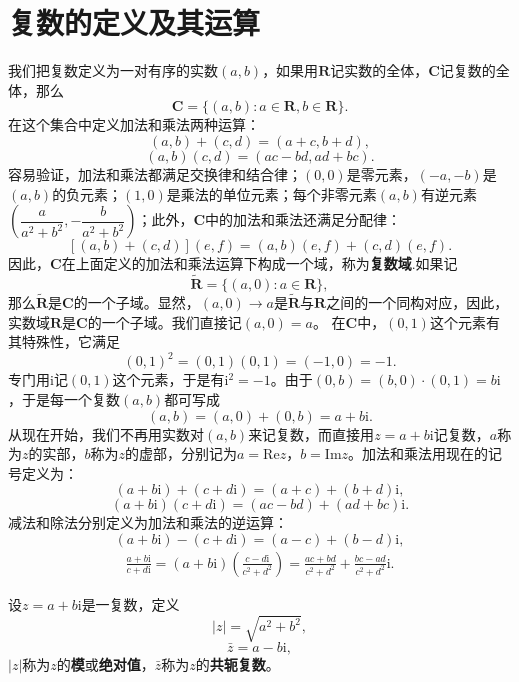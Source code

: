 \documentclass[../../main.tex]{subfiles}
\begin{document}
\section{复数的定义及其运算}

\begin{definition}[复数域]
我们把复数定义为一对有序的实数\((a,b)\)，如果用\(\mathbf{R}\)记实数的全体，\(\mathbf{C}\)记复数的全体，那么
\[
\mathbf{C} = \{ (a,b) : a \in \mathbf{R}, b \in \mathbf{R} \}.
\]
在这个集合中定义加法和乘法两种运算：
\[
(a,b) + (c,d) = (a + c, b + d),
\]
\[
(a,b)(c,d) = (ac - bd, ad + bc).
\]
容易验证，加法和乘法都满足交换律和结合律；\((0,0)\)是零元素，\((-a,-b)\)是\((a,b)\)的负元素；\((1,0)\)是乘法的单位元素；每个非零元素\((a,b)\)有逆元素\(\left( \dfrac{a}{a^2 + b^2}, -\dfrac{b}{a^2 + b^2} \right)\)；此外，\(\mathbf{C}\)中的加法和乘法还满足分配律：
\[
[(a,b) + (c,d)](e,f) = (a,b)(e,f) + (c,d)(e,f).
\]
因此，\(\mathbf{C}\)在上面定义的加法和乘法运算下构成一个域，称为\textbf{复数域}.如果记
\[
\tilde{\mathbf{R}} = \{ (a,0) : a \in \mathbf{R} \},
\]
那么\(\tilde{\mathbf{R}}\)是\(\mathbf{C}\)的一个子域。显然，\((a,0) \to a\)是\(\tilde{\mathbf{R}}\)与\(\mathbf{R}\)之间的一个同构对应，因此，实数域\(\mathbf{R}\)是\(\mathbf{C}\)的一个子域。我们直接记\((a,0) = a\)。
在\(\mathbf{C}\)中，\((0,1)\)这个元素有其特殊性，它满足
\[
(0,1)^2 = (0,1)(0,1) = (-1,0) = -1.
\]
专门用\(\mathrm{i}\)记\((0,1)\)这个元素，于是有\(\mathrm{i}^2 = -1\)。由于\((0,b) = (b,0) \cdot (0,1) = b\mathrm{i}\)，于是每一个复数\((a,b)\)都可写成
\[
(a,b) = (a,0) + (0,b) = a + b\mathrm{i}.
\]
从现在开始，我们不再用实数对\((a,b)\)来记复数，而直接用\(z = a + b\mathrm{i}\)记复数，\(a\)称为\(z\)的实部，\(b\)称为\(z\)的虚部，分别记为\(a = \mathrm{Re}z\)，\(b = \mathrm{Im}z\)。加法和乘法用现在的记号定义为：
\[
(a + b\mathrm{i}) + (c + d\mathrm{i}) = (a + c) + (b + d)\mathrm{i},
\]
\[
(a + b\mathrm{i})(c + d\mathrm{i}) = (ac - bd) + (ad + bc)\mathrm{i}.
\]
减法和除法分别定义为加法和乘法的逆运算：
\[
(a + b\mathrm{i}) - (c + d\mathrm{i}) = (a - c) + (b - d)\mathrm{i},
\]
\[
\begin{split}
\frac{a + b\mathrm{i}}{c + d\mathrm{i}} = (a + b\mathrm{i})\left( \frac{c - d\mathrm{i}}{c^2 + d^2} \right)= \frac{ac + bd}{c^2 + d^2} + \frac{bc - ad}{c^2 + d^2}\mathrm{i}.
\end{split}
\]

设\(z = a + b\mathrm{i}\)是一复数，定义
\[
|z| = \sqrt{a^2 + b^2},
\]
\[
\bar{z} = a - b\mathrm{i},
\]
\(|z|\)称为\(z\)的\textbf{模}或\textbf{绝对值}，\(\bar{z}\)称为\(z\)的\textbf{共轭复数}。
\end{definition}
\end{document}
